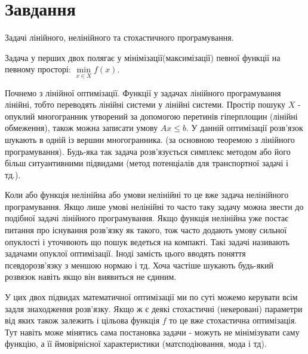 
\chapter{Завдання \theHchapter}

\begin{tcolorbox}[title=Завдання 12]
    Задачі лінійного, нелінійного та стохастичного програмування.
\end{tcolorbox}



Задача у перших двох полягає у мінімізації(максимізації) певної функції 
на певному просторі: $\min\limits_{x \in X} f(x)$.


Почнемо з лінійної оптимізації. Функції у задачах лінійного програмування 
лінійні, тобто переводять лінійні системи у лінійні системи. 
Простір пошуку $X$ - опуклий многогранник утворений за допомогою перетинів 
гіперплощин (лінійні обмеження), також можна записати умову $Ax \le b$. 
У данній оптимізації розв'язок шукають в одній із вершин многогранника.
(за основною теоремою з лінійного програмування). Будь-яка так задача 
розв'язується симплекс методом або його більш ситуантивними підвидами 
(метод потенціалів для транспортної задачі і тд.).


Коли або функція нелінійна або умови нелінійні то це вже задача нелінійного 
програмування. 
Якщо лише умові нелінійні то часто таку задачу можна звести до подібної 
задачі лінійного програмування.
Якщо функція нелінійна уже постає питання про існування
розв'язку як такого, тож часто додають умову сильної опуклості і уточнюють 
що пошук ведеться на компакті. Такі задачі називають задачами опуклої 
оптимізації.
Іноді замість цього вводять поняття псевдорозв'язку з меншою нормаю і тд. 
Хоча частіше шукають будь-який розвязок навіть якщо він виявиться 
не єдиним.


У цих двох підвидах математичної оптимізації ми по суті можемо керувати 
всім задля знаходження розв'язку. Якщо ж є деякі стохастичні (некеровані) 
параметри від яких також залежить і цільова функція $f$ то це вже 
стохастична оптимізація.
Тут навіть може мінятись сама постановка задачи - можуть не мінімізувати 
саму функцію, а її ймовірнісної характеристики (матсподіювання, мода і тд). 

